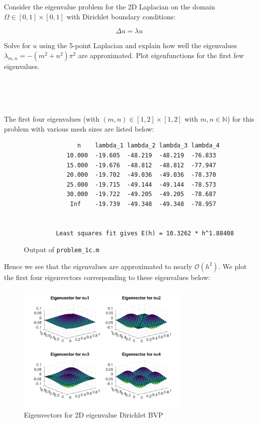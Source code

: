 Consider the eigenvalue problem for the 2D Laplacian on the domain $\Omega \in [0, 1] \times [0, 1]$ with Dirichlet
boundary conditions:

$$
\Delta u = \lambda u
$$

Solve for $u$ using the 5-point Laplacian and explain how well the eigenvalues $\lambda_{m,n} = -(m^2 + n^2)\pi^2$ are
approximated. Plot eigenfunctions for the first few eigenvalues.

\begin{solution}\ \\\\
    \ \\
    \newpage

    \noindent The first four eigenvalues (with $(m, n) \in [1, 2] \times [1, 2]$ with $ m,n \in \mathbb{N}$) for this
    problem with various mesh sizes are listed below:

    \begin{figure}[h]
        \begin{verbatim}
               n    lambda_1 lambda_2 lambda_3 lambda_4
            10.000  -19.605  -48.219  -48.219  -76.833
            15.000  -19.676  -48.812  -48.812  -77.947
            20.000  -19.702  -49.036  -49.036  -78.370
            25.000  -19.715  -49.144  -49.144  -78.573
            30.000  -19.722  -49.205  -49.205  -78.687
             Inf    -19.739  -49.348  -49.348  -78.957
          
          
         Least squares fit gives E(h) = 10.3262 * h^1.88408
        \end{verbatim}
        \caption{Output of \texttt{problem\_1c.m}}
    \end{figure}

    Hence we see that the eigenvalues are approximated to nearly $\mathcal{O}(h^2)$. We plot the first four eigenvectors
    corresponding to these eigenvalues below:

    \begin{figure}[h]
        \centering
        \includegraphics[width=0.75\textwidth]{problem_1c_eigenvectors.png}
        \caption{Eigenvectors for 2D eigenvalue Dirichlet BVP}
    \end{figure}
\end{solution}